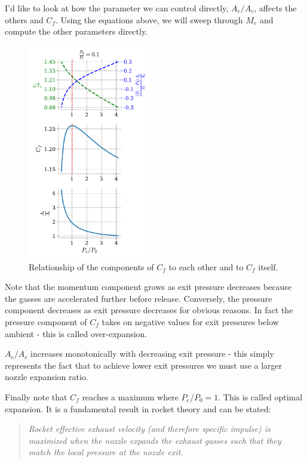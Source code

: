 \documentclass[twocolumn]{memoir} %
\begin{document}
I'd like to look at how the parameter we can control directly,
\(A_e/A_c\), affects the others and \(C_f\). Using the equations
above, we will sweep through \(M_e\) and compute the other parameters
directly.

\begin{figure}[H]
    \includegraphics[width=0.48\textwidth]{imgs/Cf.pdf}
    \caption{Relationship of the components of $C_f$ to each other and to $C_f$ itself.}
\end{figure}

Note that the momentum component grows as exit pressure decreases because the gasses are accelerated further before release.  Conversely, the pressure component decreases as exit pressure decreases for obvious reasons.  In fact the pressure component of $C_f$ takes on negative values for exit pressures below ambient - this is called over-expansion.

$A_e/A_c$ increases monotonically with decreasing exit pressure - this simply represents the fact that to achieve lower exit pressures we must use a larger nozzle expansion ratio.

Finally note that \(C_f\) reaches a maximum where \(P_e/P_0 = 1\). This
is called optimal expansion. It is a fundamental result in rocket theory
and can be stated:

\begin{quote}
    \emph{Rocket effective exhaust velocity (and therefore specific impulse) is
maximized when the nozzle expands the exhaust gasses such that they
    match the local pressure at the nozzle exit.}
\end{quote}
\end{document}
